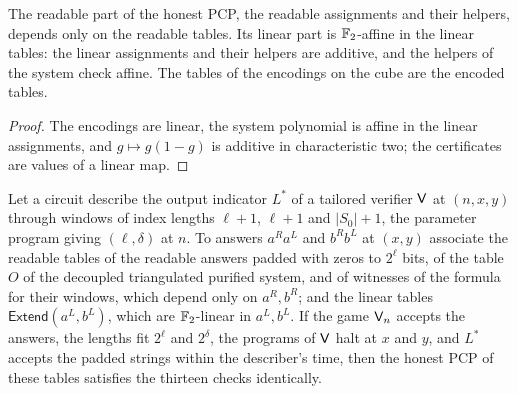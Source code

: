 \begin{lemma}
\label{lem:ar-pcp-parts}
\leanok
The readable part of the honest PCP, the readable assignments and their helpers, depends only
on the readable tables. Its linear part is $\mathbb{F}_2$-affine in the linear tables: the linear
assignments and their helpers are additive, and the helpers of the system check affine. The
tables of the encodings on the cube are the encoded tables.
\end{lemma}

\begin{proof}
\leanok
The encodings are linear, the system polynomial is affine in the linear assignments, and
$g \mapsto g(1 - g)$ is additive in characteristic two; the certificates are values of a linear
map.
\end{proof}

\begin{lemma}
\label{lem:ar-pcp-honest}
\leanok
Let a circuit describe the output indicator $L^*$ of a tailored verifier $\mathsf{V}$ at $(n, x, y)$
through windows of index lengths $\ell + 1$, $\ell + 1$ and $|S_0| + 1$, the parameter program
giving $(\ell, \delta)$ at $n$. To answers $a^R a^L$ and $b^R b^L$ at $(x, y)$ associate the
readable tables of the readable answers padded with zeros to $2^\ell$ bits, of the table $O$ of the
decoupled triangulated purified system, and of witnesses of the formula for their windows, which
depend only on $a^R, b^R$; and the linear tables $\mathsf{Extend}(a^L, b^L)$, which are
$\mathbb{F}_2$-linear in $a^L, b^L$. If the game $\mathsf{V}_n$ accepts the answers, the lengths fit
$2^\ell$ and $2^\delta$, the programs of $\mathsf{V}$ halt at $x$ and $y$, and $L^*$ accepts the
padded strings within the describer's time, then the honest PCP of these tables satisfies the
thirteen checks identically.
\end{lemma}

